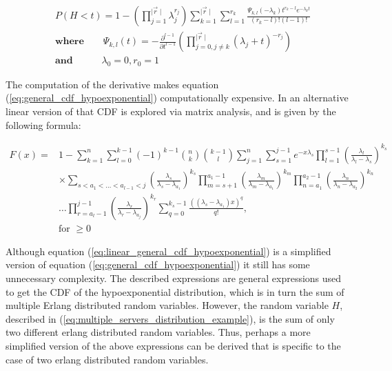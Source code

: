 \begin{align} \label{eq:general_cdf_hypoexponential}
    & P(H < t) = 1 - \left( \prod_{j=1}^{\mid \vec{r} \mid} \lambda_j^{r_j}
    \right) \sum_{k=1}^{\mid \vec{r} \mid} \sum_{l=1}^{r_k}
    \frac{\Psi_{k,l}(-\lambda_k)t^{r_k - l} e^{-\lambda_k t}}
    {(r_k - l)! (l - 1)!} \nonumber \\
    & \textbf{where} \qquad \Psi_{k,l}(t) = - \frac{\partial^{l - 1}}
    {\partial t ^{l - 1}} \left( \prod_{j = 0, j \neq k}^{\mid \vec{r} \mid}
    (\lambda_j + t)^{-r_j} \right) \nonumber \\
    & \textbf{and} \quad \qquad \lambda_0 = 0, r_0 = 1
\end{align}


The computation of the derivative makes equation (\ref{eq:general_cdf_hypoexponential})
computationally expensive.
In \cite{Legros2015} an alternative linear version of that CDF is explored via
matrix analysis, and is given by the following formula:

\small
\begin{equation} \label{eq:linear_general_cdf_hypoexponential}
    \begin{split}
        F(x) = &1 - \sum_{k=1}^{n} \sum_{l=0}^{k-1} (-1)^{k-1} \binom{n}{k}
            \binom{k-1}{l} \sum_{j=1}^{n} \sum_{s=1}^{j-1} e^{-x \lambda_s}
            \prod_{l=1}^{s-1} \left( \frac{\lambda_l}{\lambda_l - \lambda_s} \right)
            ^ {k_s} \\
        & \times \sum_{s < a_1 < \dots < a_{l-1} < j}
            \left( \frac{\lambda_s}{\lambda_s - \lambda_{a_1}} \right) ^ {k_s}
            \prod_{m=s+1}^{a_1-1} \left( \frac{\lambda_m}{\lambda_m -
            \lambda_{a_1}}\right) ^ {k_m}
            \prod_{n=a_1}^{a_2-1} \left( \frac{\lambda_n}{\lambda_n -
            \lambda_{a_2}}\right) ^ {k_n} \\
        & \dots \prod_{r=a_l-1}^{j-1} \left( \frac{\lambda_r}{\lambda_r -
            \lambda_{a_j}}\right) ^ {k_r}
            \sum_{q=0}^{k_s - 1} \frac{((\lambda_s - \lambda_{a_1})x)^q}{q!}, \\
        & \text{for } \geq 0
    \end{split}
\end{equation}
\normalsize

Although equation (\ref{eq:linear_general_cdf_hypoexponential}) is a simplified
version of equation (\ref{eq:general_cdf_hypoexponential}) it still has some
unnecessary complexity.
The described expressions are general expressions used to get the CDF of
the hypoexponential distribution, which is in turn the sum of multiple
Erlang distributed random variables.
However, the random variable \(H\), described in
(\ref{eq:multiple_servers_distribution_example}), is the sum of only two
different erlang distributed random variables.
Thus, perhaps a more simplified version of the above expressions can be derived
that is specific to the case of two erlang distributed random variables.


